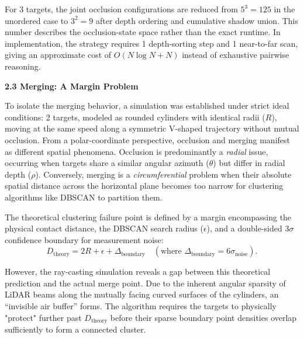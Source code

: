 \documentclass[11pt,a4paper]{report}
\newcommand{\boxitemtitle}[1]{
    \vspace{0.5em}
    {\large\textbf{\color{DeepBlue} #1}}\par
    \vspace{0.8em}
}
\begin{document}
\begin{contentbox}
For 3 targets, the joint occlusion configurations are reduced from $5^3=125$ in the unordered case to $3^2=9$ after depth ordering and cumulative shadow union. This number describes the occlusion-state space rather than the exact runtime. In implementation, the strategy requires 1 depth-sorting step and 1 near-to-far scan, giving an approximate cost of $O(N\log N + N)$ instead of exhaustive pairwise reasoning.

\end{contentbox}
\newpage

\boxitemtitle{2.3 Merging: A Margin Problem}
\begin{contentbox}
To isolate the merging behavior, a simulation was established under strict ideal conditions: 2 targets, modeled as rounded cylinders with identical radii ($R$), moving at the same speed along a symmetric V-shaped trajectory without mutual occlusion. From a polar-coordinate perspective, occlusion and merging manifest as different spatial phenomena. Occlusion is predominantly a \textit{radial} issue, occurring when targets share a similar angular azimuth ($\theta$) but differ in radial depth ($\rho$). Conversely, merging is a \textit{circumferential} problem when their absolute spatial distance across the horizontal plane becomes too narrow for clustering algorithms like DBSCAN to partition them.

\vspace*{0.2em}
The theoretical clustering failure point is defined by a margin encompassing the physical contact distance, the DBSCAN search radius ($\epsilon$), and a double-sided $3\sigma$ confidence boundary for measurement noise:
\begin{equation}
D_{\text{theory}} = 2R + \epsilon + \Delta_{\text{boundary}} \quad (\text{where } \Delta_{\text{boundary}} = 6\sigma_{\text{noise}}).
\end{equation}


\begin{minipage}[t]{0.42\textwidth}
\vspace{0pt} %
\small
However, the ray-casting simulation reveals a gap between this theoretical prediction and the actual merge point. Due to the inherent angular sparsity of LiDAR beams along the mutually facing curved surfaces of the cylinders, an ``invisible air buffer'' forms. The algorithm requires the targets to physically "protect" further past $D_{\text{theory}}$ before their sparse boundary point densities overlap sufficiently to form a connected cluster.


\end{minipage}
\end{contentbox}
\end{document}
